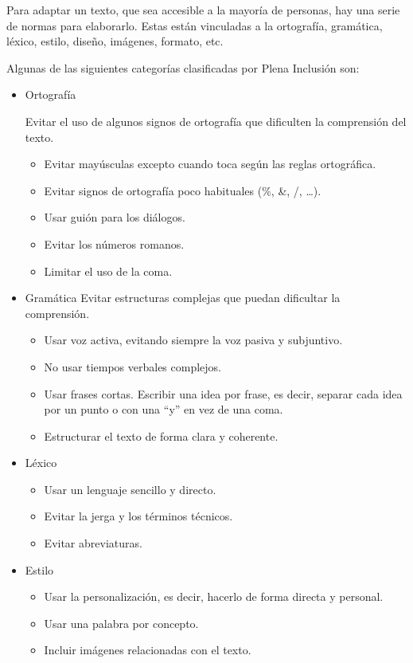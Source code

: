 Para adaptar un texto, que sea accesible a la mayoría de personas, hay una serie de normas para elaborarlo. Estas están vinculadas a la ortografía, gramática, léxico, estilo, diseño, imágenes, formato, etc. 

Algunas de las siguientes categorías clasificadas por Plena Inclusión \citep{LFMetodos} son:
	\begin{itemize}
\item Ortografía

Evitar el uso de algunos signos de ortografía que dificulten la comprensión del texto.
	\begin{itemize}
\item	Evitar mayúsculas excepto cuando toca según las reglas ortográfica.
	
\item	Evitar signos de ortografía poco habituales (\%, \&, /, …).
\item Usar guión para los diálogos.
\item Evitar los números romanos.
	\item Limitar el uso de la coma.


 \end{itemize}
\item Gramática
Evitar estructuras complejas que puedan dificultar la comprensión.
\begin{itemize}
	\item Usar voz activa, evitando siempre la voz pasiva y subjuntivo.
		\item No usar tiempos verbales complejos.
			\item Usar frases cortas. Escribir una idea por frase, es decir, separar cada idea por un punto o con una ``y'' en vez de una coma. 
				\item Estructurar el texto de forma clara y coherente.
 \end{itemize}

\item Léxico
\begin{itemize}
	\item Usar un lenguaje sencillo y directo. 
		\item Evitar la jerga y los términos técnicos. 
			\item Evitar abreviaturas.    	
 \end{itemize}

\item Estilo

\begin{itemize}
	\item Usar la personalización, es decir, hacerlo de forma directa y personal. 

	\item Usar una palabra por concepto.
	

	\item Incluir imágenes relacionadas con el texto.
 \end{itemize}
 \end{itemize}
